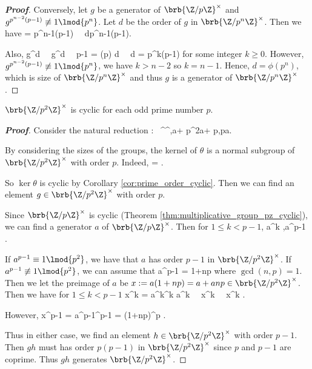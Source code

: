 \begin{proof}[\bf Proof]
Conversely, let $g$ be a generator of $\brb{\Z/p\Z}^\times$ and $g^{p^{n-2}(p-1)} \not\equiv 1 \lmod{p^n}$. Let $d$ be the order of $g$ in $\brb{\Z/p^n\Z}^\times$. Then we have
\be
\phi{} = p^{n-1}(p-1) \ \ra\ d\mid p^{n-1}(p-1).
\ee

Also,
\be
g^d   \ \ra\ g^d   \ \ra\ p-1 = \phi(p) \mid d \ \ra\ d = p^k(p-1)
\ee
for some integer $k\geq 0$. However, $g^{p^{n-2}(p-1)} \not\equiv 1 \lmod{p^n}$, we have $k>n-2$ so $k=n-1$. Hence, $d = \phi(p^n)$, which is size of $\brb{\Z/p^n\Z}^\times$ and thus $g$ is a generator of $\brb{\Z/p^n\Z}^\times$.
\end{proof}


\begin{lemma}\label{lem:multiplicative_group_zp2z_cyclic}
$\brb{\Z/p^2\Z}^\times$ is cyclic for each odd prime number $p$.
\end{lemma}

\begin{proof}[\bf Proof]%
Consider the natural reduction
\be
\theta: \ ^\times \to {}^\times,\quad a+ p^2\Z \mapsto a+ p\Z,\qquad p\nmid a.%
\ee

%

By considering the sizes of the groups, the kernel of $\theta$ is a normal subgroup of $\brb{\Z/p^2\Z}^\times$ with order $p$. Indeed,
\be
\ker\theta = .
\ee

So $\ker\theta$ is cyclic by Corollary \ref{cor:prime_order_cyclic}. Then we can find an element $g\in \brb{\Z/p^2\Z}^\times$ with order $p$.

Since $\brb{\Z/p\Z}^\times$ is cyclic (Theorem \ref{thm:multiplicative_group_pz_cyclic}), we can find a generator $a$ of $\brb{\Z/p\Z}^\times$. Then for $1\leq k< p-1$,
\be
a^{k} \not{} ,\quad a^{p-1} .
\ee

If $a^{p-1}\equiv 1\lmod{p^2}$, we have that $a$ has order $p-1$ in $\brb{\Z/p^2\Z}^\times$. If $a^{p-1}\not\equiv 1\lmod{p^2}$, we can assume that
\be
a^{p-1} = 1+np
\ee
where $\gcd(n,p)=1$. Then we let the preimage of $a$ be $x := a(1+np) = a + anp \in \brb{\Z/p^2\Z}^\times$. %
Then we have for $1\leq k < p-1$
\be
x^{k} = a^k^k \equiv a^k  \ \ra\ x^k \not{} \ \ra\ x^k \not{} .
\ee

However,
\be
x^{p-1} = a^{p-1}^{p-1} = (1+np)^p  .%
\ee

Thus in either case, we find an element $h\in \brb{\Z/p^2\Z}^\times$ with order $p-1$. Then $gh$ must has order $p(p-1)$ in $\brb{\Z/p^2\Z}^\times$ since $p$ and $p-1$ are coprime. Thus $gh$ generates $\brb{\Z/p^2\Z}^\times$.



\end{proof}%

